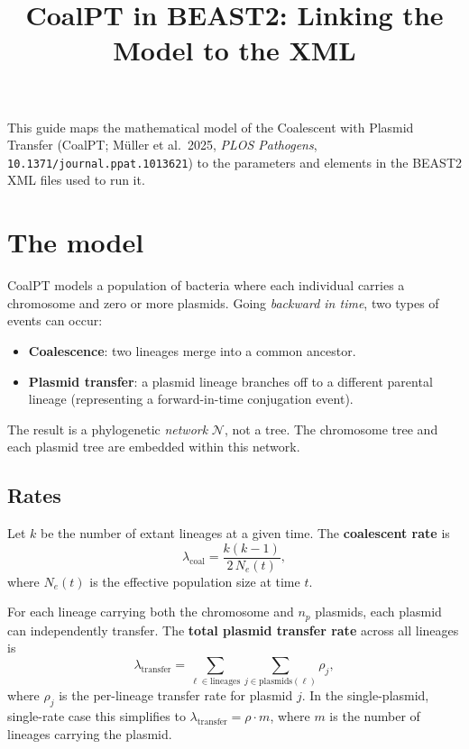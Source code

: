 \documentclass[11pt]{article}
\title{CoalPT in BEAST2: Linking the Model to the XML}
\author{}
\date{}
\begin{document}
\maketitle

\noindent This guide maps the mathematical model of the Coalescent with Plasmid Transfer (CoalPT; M\"uller et al.\ 2025, \textit{PLOS Pathogens}, \texttt{10.1371/journal.ppat.1013621}) to the parameters and elements in the BEAST2 XML files used to run it.

\section{The model}

CoalPT models a population of bacteria where each individual carries a chromosome and zero or more plasmids. Going \emph{backward in time}, two types of events can occur:

\begin{itemize}
  \item \textbf{Coalescence}: two lineages merge into a common ancestor.
  \item \textbf{Plasmid transfer}: a plasmid lineage branches off to a different parental lineage (representing a forward-in-time conjugation event).
\end{itemize}

\noindent The result is a phylogenetic \emph{network} $\mathcal{N}$, not a tree. The chromosome tree and each plasmid tree are embedded within this network.

\subsection{Rates}

Let $k$ be the number of extant lineages at a given time. The \textbf{coalescent rate} is
\begin{equation}
  \lambda_{\text{coal}} = \frac{k(k-1)}{2 \, N_e(t)},
\end{equation}
where $N_e(t)$ is the effective population size at time $t$.

For each lineage carrying both the chromosome and $n_p$ plasmids, each plasmid can independently transfer. The \textbf{total plasmid transfer rate} across all lineages is
\begin{equation}
  \lambda_{\text{transfer}} = \sum_{\ell \in \text{lineages}} \sum_{j \in \text{plasmids}(\ell)} \rho_j,
\end{equation}
where $\rho_j$ is the per-lineage transfer rate for plasmid $j$. In the single-plasmid, single-rate case this simplifies to $\lambda_{\text{transfer}} = \rho \cdot m$, where $m$ is the number of lineages carrying the plasmid.
\end{document}
